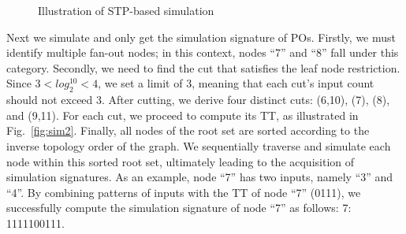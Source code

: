 \documentclass[conference]{IEEEtran}
\begin{document}
\begin{figure}[t]
  \centering  %
  \subfigbottomskip=-4pt %
  \subfigcapskip=-5pt %
      \hspace{15mm}
  \caption{Illustration of STP-based simulation}
  \label{fig:sim}
  \vspace{-2mm}
\end{figure}

Next we simulate and only get the simulation signature of POs.
Firstly, we must identify multiple fan-out nodes; in this context, nodes ``7'' and ``8'' fall under this category.
Secondly, we need to find the cut that satisfies the leaf node restriction. 
Since $3 < log_2^{10} < 4$, we set a limit of 3, meaning that each cut's input count should not exceed 3.
After cutting, we derive four distinct cuts: (6,10), (7), (8), and (9,11). 
For each cut, we proceed to compute its TT, as illustrated in Fig.~\ref{fig:sim2}.
Finally, all nodes of the root set are sorted according to the inverse topology order of the graph. 
We sequentially traverse and simulate each node within this sorted root set, ultimately leading to the acquisition of simulation signatures.
As an example, node ``7'' has two inputs, namely ``3'' and ``4''.
By combining patterns of inputs with the TT of node ``7'' (0111), we successfully compute the simulation signature of node ``7'' as follows: 7: 1111100111.

\vspace{-2mm}
\end{document}
